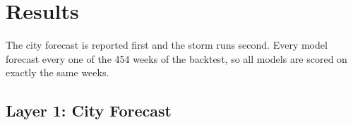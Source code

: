 \section{Results}\label{sec:results}

The city forecast is reported first and the storm runs second. Every model forecast every one of
the 454 weeks of the backtest, so all models are scored on exactly the same weeks.

\subsection{Layer 1: City Forecast}\label{sec:results-layer1}

